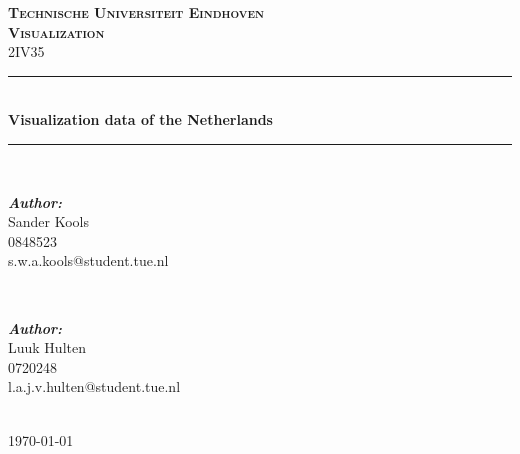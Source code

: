 \documentclass[a4paper,twoside,11pt]{article}
\newcommand{\HRule}{\rule{\linewidth}{0.5mm}} %
\begin{document}
\begin{titlepage}

\center %

\textsc{\Huge \textbf{Technische Universiteit Eindhoven}}\\[1.5cm] %
\textsc{\LARGE \textbf{Visualization}}\\[0.5cm] %
\textsc{\large 2IV35}\\[0.5cm] %

\HRule \\[0.4cm]
{ \huge \bfseries Visualization data of the Netherlands}\\[0.4cm] %
\HRule \\[1.5cm]

\begin{minipage}{0.4\textwidth}
\begin{flushleft} \large
\emph{\textbf{Author:}}\\
Sander Kools \\
0848523 \\
s.w.a.kools@student.tue.nl %
\end{flushleft}
\end{minipage}
~
\begin{minipage}{0.4\textwidth}
\begin{flushright} \large
\emph{\textbf{Author:}}\\
Luuk Hulten\\
0720248 \\
l.a.j.v.hulten@student.tue.nl
\end{flushright}
\end{minipage}\\[4cm]

{\large \today}\\[3cm] %

\vfill %

\end{titlepage}
\end{document}

